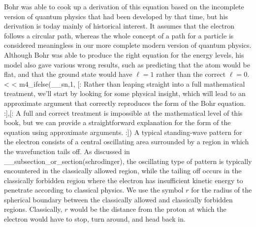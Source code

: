 Bohr was able to cook up a derivation of this equation based
on the incomplete version of quantum physics that had been
developed by that time, but his derivation is today mainly
of historical interest. It assumes that the electron follows
a circular path, whereas the whole concept of a path for a
particle is considered meaningless in our more complete
modern version of quantum physics. Although Bohr was able to
produce the right equation for the energy levels, his model
also gave various wrong results, such as predicting that the
atom would be flat, and that the ground state would have
$\ell=1$ rather than the correct $\ell=0$.
<%
<%
m4_ifelse(__sn,1,
[:
  Rather than leaping straight into a full mathematical treatment, we'll start by looking for some physical insight,
  which will lead to an approximate argument that correctly reproduces the form of the Bohr equation.
:],[:
  A full and correct treatment is impossible at the mathematical
  level of this book, but we can provide a straightforward
  explanation for the form of the equation using approximate
  arguments. 
:])
A typical standing-wave pattern for the electron
consists of a central oscillating area surrounded by a
region in which the wavefunction tails off. As discussed in
__subsection_or_section(schrodinger), the oscillating type of pattern is typically
encountered in the classically allowed region, while the
tailing off occurs in the classically forbidden region where
the electron has insufficient kinetic energy to penetrate
according to classical physics. We use the symbol $r$ for
the radius of the spherical boundary between the classically
allowed and classically forbidden regions.
Classically, $r$ would be the distance from the proton at which
the electron would have to stop,
turn around, and head back in.

